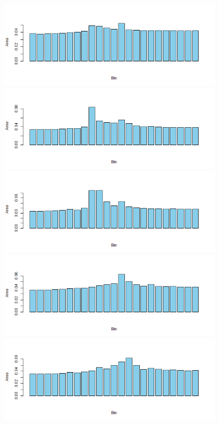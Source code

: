 \documentclass[11pt]{article}
\theoremstyle{plain}
\theoremstyle{definition}
\begin{document}
\begin{figure}[H]
\begin{center}
\includegraphics[trim ={3.5cm 2.7cm 2cm 2cm},scale=.6, clip=true]{Binned_Areas5.png}
\includegraphics[trim ={3.5cm 2.7cm 2cm 2cm},scale=.6, clip=true]{Binned_Areas6.png}
\includegraphics[trim ={3.5cm 2.7cm 2cm 2cm},scale=.6, clip=true]{Binned_Areas7.png}
\includegraphics[trim ={3.5cm 2.7cm 2cm 2cm},scale=.6, clip=true]{Binned_Areas8.png}
\includegraphics[trim ={3.5cm 2.7cm 2cm 2cm},scale=.6, clip=true]{Binned_Areas9.png}

\end{center}
\end{figure}
\end{document}
